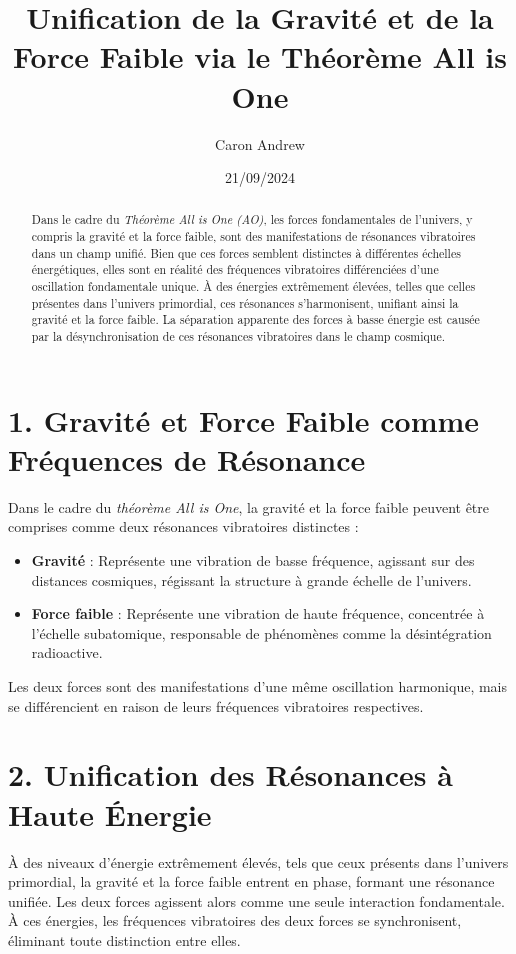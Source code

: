 \documentclass{article}
\title{Unification de la Gravité et de la Force Faible via le Théorème All is One}
\author{Caron Andrew}
\date{21/09/2024}
\begin{document}
\maketitle

\begin{abstract}
Dans le cadre du \textit{Théorème All is One (AO)}, les forces fondamentales de l'univers, y compris la gravité et la force faible, sont des manifestations de résonances vibratoires dans un champ unifié. Bien que ces forces semblent distinctes à différentes échelles énergétiques, elles sont en réalité des fréquences vibratoires différenciées d'une oscillation fondamentale unique. À des énergies extrêmement élevées, telles que celles présentes dans l'univers primordial, ces résonances s'harmonisent, unifiant ainsi la gravité et la force faible. La séparation apparente des forces à basse énergie est causée par la désynchronisation de ces résonances vibratoires dans le champ cosmique.
\end{abstract}

\section{1. Gravité et Force Faible comme Fréquences de Résonance}

Dans le cadre du \textit{théorème All is One}, la gravité et la force faible peuvent être comprises comme deux résonances vibratoires distinctes :
\begin{itemize}
    \item \textbf{Gravité} : Représente une vibration de basse fréquence, agissant sur des distances cosmiques, régissant la structure à grande échelle de l'univers.
    \item \textbf{Force faible} : Représente une vibration de haute fréquence, concentrée à l'échelle subatomique, responsable de phénomènes comme la désintégration radioactive.
\end{itemize}

Les deux forces sont des manifestations d'une même oscillation harmonique, mais se différencient en raison de leurs fréquences vibratoires respectives.

\section{2. Unification des Résonances à Haute Énergie}

À des niveaux d'énergie extrêmement élevés, tels que ceux présents dans l'univers primordial, la gravité et la force faible entrent en phase, formant une résonance unifiée. Les deux forces agissent alors comme une seule interaction fondamentale. À ces énergies, les fréquences vibratoires des deux forces se synchronisent, éliminant toute distinction entre elles.
\end{document}
